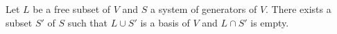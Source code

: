 Let $L$ be a free subset of $V$ and $S$ a system of generators of $V$. There exists a subset $S'$ of $S$ such that $L \cup S'$ is a basis of $V$ and $L \cap S'$ is empty.
